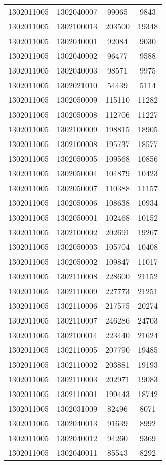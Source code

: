 \begin{longtable}[h]{llcc}
		1302011005 & 1302040007 & 99065 & 9843\\
		1302011005 & 1302100013 & 203500 & 19348\\
		1302011005 & 1302040001 & 92084 & 9030\\
		1302011005 & 1302040002 & 96477 & 9588\\
		1302011005 & 1302040003 & 98571 & 9975\\
		1302011005 & 1302021010 & 54439 & 5114\\
		1302011005 & 1302050009 & 115110 & 11282\\
		1302011005 & 1302050008 & 112706 & 11227\\
		1302011005 & 1302100009 & 198815 & 18905\\
		1302011005 & 1302100008 & 195737 & 18577\\
		1302011005 & 1302050005 & 109568 & 10856\\
		1302011005 & 1302050004 & 104879 & 10423\\
		1302011005 & 1302050007 & 110388 & 11157\\
		1302011005 & 1302050006 & 108638 & 10934\\
		1302011005 & 1302050001 & 102468 & 10152\\
		1302011005 & 1302100002 & 202691 & 19267\\
		1302011005 & 1302050003 & 105704 & 10408\\
		1302011005 & 1302050002 & 109847 & 11017\\
		1302011005 & 1302110008 & 228600 & 21152\\
		1302011005 & 1302110009 & 227773 & 21251\\
		1302011005 & 1302110006 & 217575 & 20274\\
		1302011005 & 1302110007 & 246286 & 24703\\
		1302011005 & 1302100014 & 223440 & 21624\\
		1302011005 & 1302110005 & 207790 & 19485\\
		1302011005 & 1302110002 & 203881 & 19193\\
		1302011005 & 1302110003 & 202971 & 19083\\
		1302011005 & 1302110001 & 199443 & 18742\\
		1302011005 & 1302031009 & 82496 & 8071\\
		1302011005 & 1302040013 & 91639 & 8992\\
		1302011005 & 1302040012 & 94260 & 9369\\
		1302011005 & 1302040011 & 85543 & 8292\\

\end{longtable}
